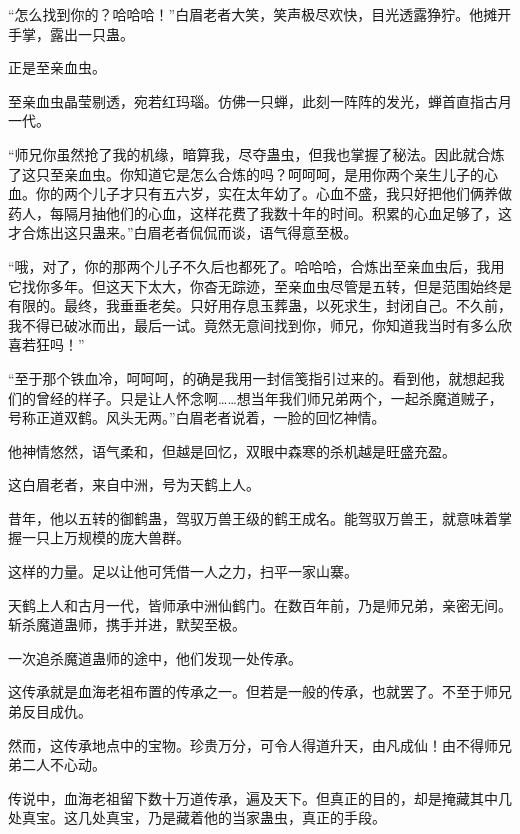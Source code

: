 
\begin{this_body}



“怎么找到你的？哈哈哈！”白眉老者大笑，笑声极尽欢快，目光透露狰狞。他摊开手掌，露出一只蛊。

正是至亲血虫。

至亲血虫晶莹剔透，宛若红玛瑙。仿佛一只蝉，此刻一阵阵的发光，蝉首直指古月一代。

“师兄你虽然抢了我的机缘，暗算我，尽夺蛊虫，但我也掌握了秘法。因此就合炼了这只至亲血虫。你知道它是怎么合炼的吗？呵呵呵，是用你两个亲生儿子的心血。你的两个儿子才只有五六岁，实在太年幼了。心血不盛，我只好把他们俩养做药人，每隔月抽他们的心血，这样花费了我数十年的时间。积累的心血足够了，这才合炼出这只蛊来。”白眉老者侃侃而谈，语气得意至极。

“哦，对了，你的那两个儿子不久后也都死了。哈哈哈，合炼出至亲血虫后，我用它找你多年。但这天下太大，你杳无踪迹，至亲血虫尽管是五转，但是范围始终是有限的。最终，我垂垂老矣。只好用存息玉葬蛊，以死求生，封闭自己。不久前，我不得已破冰而出，最后一试。竟然无意间找到你，师兄，你知道我当时有多么欣喜若狂吗！”

“至于那个铁血冷，呵呵呵，的确是我用一封信笺指引过来的。看到他，就想起我们的曾经的样子。只是让人怀念啊……想当年我们师兄弟两个，一起杀魔道贼子，号称正道双鹤。风头无两。”白眉老者说着，一脸的回忆神情。

他神情悠然，语气柔和，但越是回忆，双眼中森寒的杀机越是旺盛充盈。

这白眉老者，来自中洲，号为天鹤上人。

昔年，他以五转的御鹤蛊，驾驭万兽王级的鹤王成名。能驾驭万兽王，就意味着掌握一只上万规模的庞大兽群。

这样的力量。足以让他可凭借一人之力，扫平一家山寨。

天鹤上人和古月一代，皆师承中洲仙鹤门。在数百年前，乃是师兄弟，亲密无间。斩杀魔道蛊师，携手并进，默契至极。

一次追杀魔道蛊师的途中，他们发现一处传承。

这传承就是血海老祖布置的传承之一。但若是一般的传承，也就罢了。不至于师兄弟反目成仇。

然而，这传承地点中的宝物。珍贵万分，可令人得道升天，由凡成仙！由不得师兄弟二人不心动。

传说中，血海老祖留下数十万道传承，遍及天下。但真正的目的，却是掩藏其中几处真宝。这几处真宝，乃是藏着他的当家蛊虫，真正的手段。


\end{this_body}
